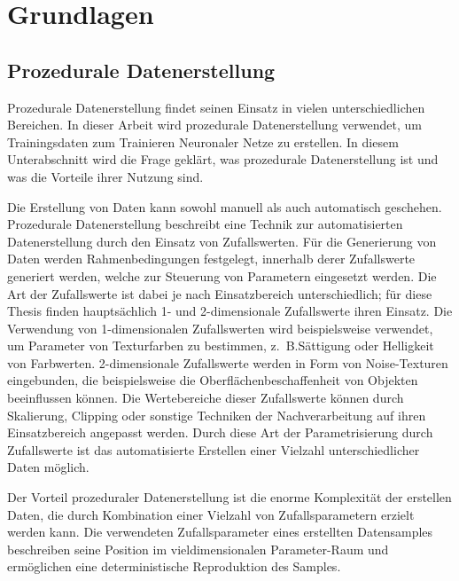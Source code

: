 
\section{Grundlagen}
\label{sec:daten:grundlagen}



\subsection{Prozedurale Datenerstellung}  %
\label{sec:prozedurale_datenerstellung}

Prozedurale Datenerstellung findet seinen Einsatz in vielen unterschiedlichen Bereichen. In dieser Arbeit wird prozedurale Datenerstellung verwendet, um Trainingsdaten zum Trainieren Neuronaler Netze zu erstellen. In diesem Unterabschnitt wird die Frage geklärt, was prozedurale Datenerstellung ist und was die Vorteile ihrer Nutzung sind.

Die Erstellung von Daten kann sowohl manuell als auch automatisch geschehen. Prozedurale Datenerstellung beschreibt eine Technik zur automatisierten Datenerstellung durch den Einsatz von Zufallswerten. Für die Generierung von Daten werden Rahmenbedingungen festgelegt, innerhalb derer Zufallswerte generiert werden, welche zur Steuerung von Parametern eingesetzt werden. Die Art der Zufallswerte ist dabei je nach Einsatzbereich unterschiedlich; für diese Thesis finden hauptsächlich 1- und 2-dimensionale Zufallswerte ihren Einsatz. Die Verwendung von 1-dimensionalen Zufallswerten wird beispielsweise verwendet, um Parameter von Texturfarben zu bestimmen, z.~B.Sättigung oder Helligkeit von Farbwerten. 2-dimensionale Zufallswerte werden in Form von Noise-Texturen eingebunden, die beispielsweise die Oberflächenbeschaffenheit von Objekten beeinflussen können. Die Wertebereiche dieser Zufallswerte können durch Skalierung, Clipping oder sonstige Techniken der Nachverarbeitung auf ihren Einsatzbereich angepasst werden. Durch diese Art der Parametrisierung durch Zufallswerte ist das automatisierte Erstellen einer Vielzahl unterschiedlicher Daten möglich.

Der Vorteil prozeduraler Datenerstellung ist die enorme Komplexität der erstellen Daten, die durch Kombination einer Vielzahl von Zufallsparametern erzielt werden kann. Die verwendeten Zufallsparameter eines erstellten Datensamples beschreiben seine Position im vieldimensionalen Parameter-Raum und ermöglichen eine deterministische Reproduktion des Samples.

